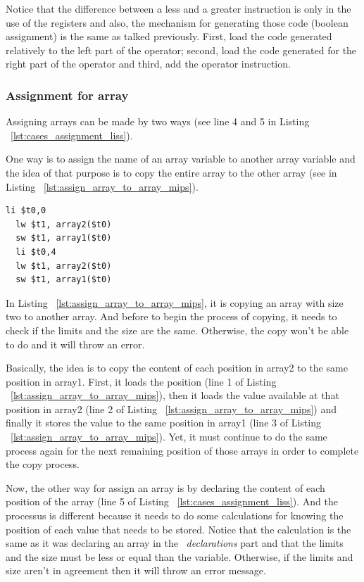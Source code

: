 \documentclass[
  oneside,
  11pt, a4paper,
  footinclude=true,
  headinclude=true,
  cleardoublepage=empty
]{scrbook}
\begin{document}
Notice that the difference between a less and a greater instruction is only in the use of the registers and also, the mechanism for generating those code (boolean assignment) is the same as talked previously. First, load the code generated relatively to the left part of the operator; second, load the code generated for the right part of the operator and third, add the operator instruction.



\subsubsection{Assignment for array}

Assigning arrays can be made by two ways (see line 4 and 5 in Listing ~\ref{lst:cases_assignment_liss}).

One way is to assign the name of an array variable to another array variable and the idea of that purpose is to copy the entire array to the other array (see in Listing ~\ref{lst:assign_array_to_array_mips}).

\begin{lstlisting}[caption={Code generated for line 4 in Listing ~\ref{lst:cases_assignment_liss}},label={lst:assign_array_to_array_mips}]
  li $t0,0		
  lw $t1, array2($t0)		
  sw $t1, array1($t0)		
  li $t0,4		
  lw $t1, array2($t0)		
  sw $t1, array1($t0)		
\end{lstlisting}

In Listing ~\ref{lst:assign_array_to_array_mips}, it is copying an array with size two to another array. And before to begin the process of copying, it needs to check if the limits and the size are the same. Otherwise, the copy won't be able to do and it will throw an error. 

Basically, the idea is to copy the content of each position in array2 to the same position in array1. First, it loads the position (line 1 of Listing ~\ref{lst:assign_array_to_array_mips}), then it loads the value available at that position in array2 (line 2 of Listing ~\ref{lst:assign_array_to_array_mips}) and finally it stores the value to the same position in array1 (line 3 of Listing ~\ref{lst:assign_array_to_array_mips}). Yet, it must continue to do the same process again for the next remaining position of those arrays in order to complete the copy process.

Now, the other way for assign an array is by declaring the content of each position of the array (line 5 of Listing ~\ref{lst:cases_assignment_liss}).
And the processus is different because it needs to do some calculations for knowing the position of each value that needs to be stored. Notice that the calculation is the same as it was declaring an array in the ~\textit{declarations} part and that the limits and the size must be less or equal than the variable. Otherwise, if the limits and size aren't in agreement then it will throw an error message.
\end{document}

